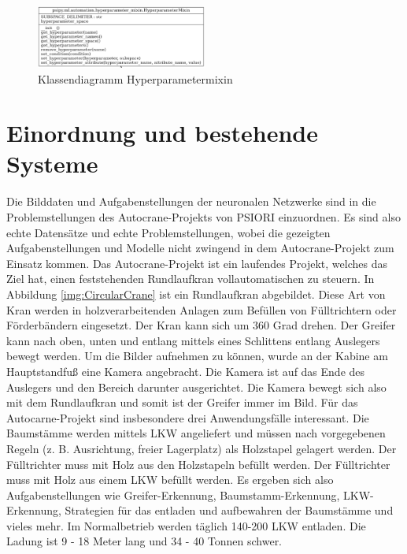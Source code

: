 	\begin{figure}[h]
		\centering
		\includegraphics[width=0.5\textwidth, center]{bilder/Klassendiagramme/Hyperparametermixin.png}
		\caption[Klassendiagramm Hyperparametermixin]{Klassendiagramm Hyperparametermixin}
		\label{img:KlassendiagrammHyperparametermixin}
	\end{figure}  
	
	\section{Einordnung und bestehende Systeme}
	\label{sec:BestehendesSystem}
	Die Bilddaten und Aufgabenstellungen der neuronalen Netzwerke sind in die Problemstellungen des Autocrane-Projekts von PSIORI einzuordnen. Es sind also echte Datensätze und echte Problemstellungen, wobei die gezeigten Aufgabenstellungen und Modelle nicht zwingend in dem Autocrane-Projekt zum Einsatz kommen. Das Autocrane-Projekt ist ein laufendes Projekt, welches das Ziel hat, einen feststehenden Rundlaufkran vollautomatischen zu steuern. In Abbildung \ref{img:CircularCrane} ist ein Rundlaufkran abgebildet. Diese Art von Kran werden in holzverarbeitenden Anlagen zum Befüllen von Fülltrichtern oder Förderbändern eingesetzt. Der Kran kann sich um 360 Grad drehen. Der Greifer kann nach oben, unten und entlang mittels eines Schlittens entlang Auslegers bewegt werden. Um die Bilder aufnehmen zu können, wurde an der Kabine am Hauptstandfuß eine Kamera angebracht. Die Kamera ist auf das Ende des Auslegers und den Bereich darunter ausgerichtet. Die Kamera bewegt sich also mit dem Rundlaufkran und somit ist der Greifer immer im Bild. Für das Autocarne-Projekt sind insbesondere drei Anwendungsfälle interessant. Die Baumstämme werden mittels LKW angeliefert und müssen nach vorgegebenen Regeln (z. B. Ausrichtung, freier Lagerplatz) als Holzstapel gelagert werden. Der Fülltrichter muss mit Holz aus den Holzstapeln befüllt werden. Der Fülltrichter muss mit Holz aus einem LKW befüllt werden. Es ergeben sich also Aufgabenstellungen wie Greifer-Erkennung, Baumstamm-Erkennung, LKW-Erkennung, Strategien für das entladen und aufbewahren der Baumstämme und vieles mehr. Im Normalbetrieb werden täglich 140-200 LKW entladen. Die Ladung ist 9 - 18 Meter lang und 34 - 40 Tonnen schwer. \cite{PSIORIGmbH.2020}
